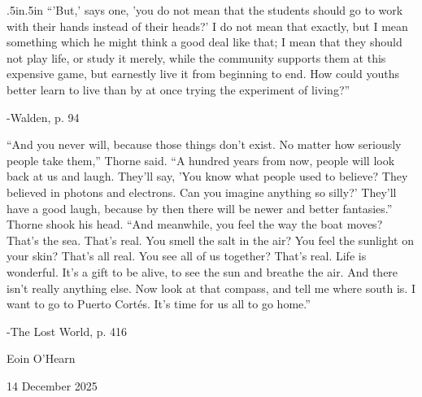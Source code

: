 \documentclass[12pt, AofM.tex]{subfiles}
\begin{document}
\begin{adjustwidth}{.5in}{.5in}
“'But,' says one, 'you do not mean that the students should go to work with their hands instead of their heads?' I do not mean that exactly, but I mean something which he might think a good deal like that; I mean that they should not play life, or study it merely, while the community supports them at this expensive game, but earnestly live it from beginning to end. How could youths better learn to live than by at once trying the experiment of living?”

\begin{flushright}
    -Walden, p. 94
\end{flushright}


\medskip

“And you never will, because those things don't exist. No matter how seriously people take them,” Thorne said. “A hundred years from now, people will look back at us and laugh. They'll say, 'You know what people used to believe? They believed in photons and electrons. Can you imagine anything so silly?' They'll have a good laugh, because by then there will be newer and better fantasies.” Thorne shook his head. “And meanwhile, you feel the way the boat moves? That's the sea. That's real. You smell the salt in the air? You feel the sunlight on your skin? That's all real. You see all of us together? That's real. Life is wonderful. It's a gift to be alive, to see the sun and breathe the air. And there isn't really anything else. Now look at that compass, and tell me where south is. I want to go to Puerto Cortés. It's time for us all to go home.”

\begin{flushright}
    -The Lost World, p. 416
\end{flushright}

\end{adjustwidth}

\medskip
Eoin O'Hearn

14 December 2025	
 
\end{document}
